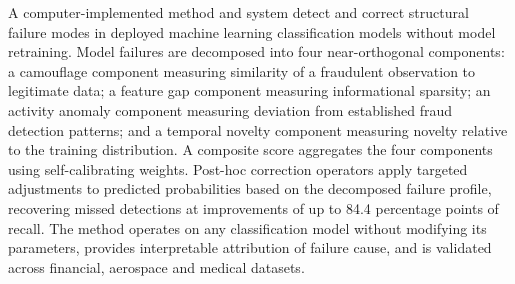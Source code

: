 \documentclass[12pt,a4paper]{article}
\begin{document}
A computer-implemented method and system detect and correct structural
failure modes in deployed machine learning classification models without
model retraining. Model failures are decomposed into four near-orthogonal
components: a camouflage component measuring similarity of a fraudulent
observation to legitimate data; a feature gap component measuring
informational sparsity; an activity anomaly component measuring deviation
from established fraud detection patterns; and a temporal novelty component
measuring novelty relative to the training distribution. A composite score
aggregates the four components using self-calibrating weights. Post-hoc
correction operators apply targeted adjustments to predicted probabilities
based on the decomposed failure profile, recovering missed detections at
improvements of up to 84.4 percentage points of recall. The method operates
on any classification model without modifying its parameters, provides
interpretable attribution of failure cause, and is validated across
financial, aerospace and medical datasets.
\end{document}

